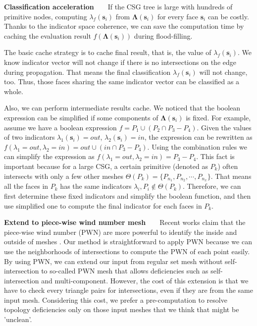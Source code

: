\documentclass[10pt,journal,compsoc]{IEEEtran}
\begin{document}
\vspace{0.5em}
\noindent\textbf{Classification acceleration}~~~~If the CSG tree is large with hundreds of primitive nodes, computing $\lambda_f(\bm{s}_i)$ from $\boldsymbol{\Lambda}(\bm{s}_i)$ for every face $\bm{s}_i$ can be costly. Thanks to the indicator space coherence, we can save the computation time by caching the evaluation result $f(\boldsymbol{\Lambda}(\bm{s}_i))$ during flood-filling.

The basic cache strategy is to cache final result, that is, the value of $\lambda_f(\bm{s}_i)$. We know indicator vector will not change if there is no intersections on the edge during propagation. That means the final classification $\lambda_f(\bm{s}_i)$ will not change, too. Thus, those faces sharing the same indicator vector can be classified as a whole.

Also, we can perform intermediate results cache. We noticed that the boolean expression can be simplified if some components of $\boldsymbol{\Lambda}(\bm{s}_i)$ is fixed. For example, assume we have a boolean expression $f = P_1\cup (P_2\cap P_3-P_4)$. Given the values of two indicators $\lambda_1(\bm{s}_i)=out$, $\lambda_2(\bm{s}_i)=in$, the expression can be rewritten as $f(\lambda_1=out, \lambda_2=in)=out\cup (in\cap P_3-P_4)$. Using the combination rules we can simplify the expression as $f(\lambda_1=out, \lambda_2=in)=P_3-P_4$. This fact is important because for a large CSG, a certain primitive (denoted as $P_k$) often intersects with only a few other meshes $\Theta(P_k)= \{P_{n_1}, P_{n_2}, \cdots, P_{n_x}\}$. That means all the faces in $P_k$ has the same indicators $\lambda_{i}, P_{i} \notin \Theta(P_k)$. Therefore, we can first determine these fixed indicators and simplify the boolean function, and then use simplified one to compute the final indicator for each faces in $P_k$.

\vspace{0.5em}
\noindent\textbf{Extend to piece-wise wind number mesh}~~~~Recent works claim that the piece-wise wind number (PWN) are more powerful to identify the inside and outside of meshes \cite{zhou2016mesh}. Our method is straightforward to apply PWN because we can use the neighborhoods of intersections to compute the PWN of each point easily. By using PWN, we can extend our input from regular set mesh without self-intersection to so-called PWN mesh that allows deficiencies such as self-intersection and multi-component. However, the cost of this extension is that we have to check every triangle pairs for intersections, even if they are from the same input mesh. Considering this cost, we prefer a pre-computation to resolve topology deficiencies only on those input meshes that we think that might be 'unclean'.
\end{document}
